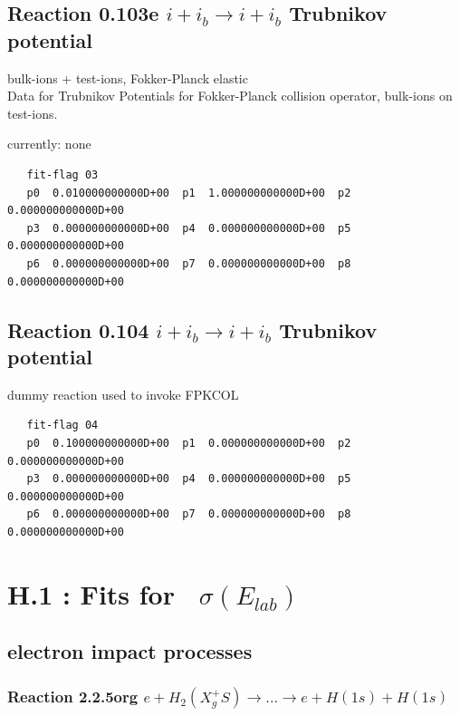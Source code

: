 \documentclass[12pt,dvipdfmx]{article}
\begin{document}
\subsection{
Reaction 0.103e $ i + i_b \rightarrow i + i_b$ Trubnikov potential}
bulk-ions + test-ions, Fokker-Planck elastic \\
Data for Trubnikov Potentials for Fokker-Planck collision
operator, bulk-ions on test-ions.

currently: none

\begin{small}\begin{verbatim}
   fit-flag 03
   p0  0.010000000000D+00  p1  1.000000000000D+00  p2  0.000000000000D+00
   p3  0.000000000000D+00  p4  0.000000000000D+00  p5  0.000000000000D+00
   p6  0.000000000000D+00  p7  0.000000000000D+00  p8  0.000000000000D+00
\end{verbatim}\end{small}

\subsection{
Reaction 0.104 $ i + i_b \rightarrow i + i_b$ Trubnikov potential}
dummy reaction used to invoke FPKCOL

\begin{small}\begin{verbatim}
   fit-flag 04
   p0  0.100000000000D+00  p1  0.000000000000D+00  p2  0.000000000000D+00
   p3  0.000000000000D+00  p4  0.000000000000D+00  p5  0.000000000000D+00
   p6  0.000000000000D+00  p7  0.000000000000D+00  p8  0.000000000000D+00
\end{verbatim}\end{small}


\newpage

\section{H.1 :  Fits for  \    $\sigma(E_{lab})$}\label{sect1}


\subsection{electron impact processes}
\subsubsection{
Reaction 2.2.5org
$ e + H_2(X_g^+S) \rightarrow . . . \rightarrow e + H(1s) + H(1s) $ }
\end{document}
